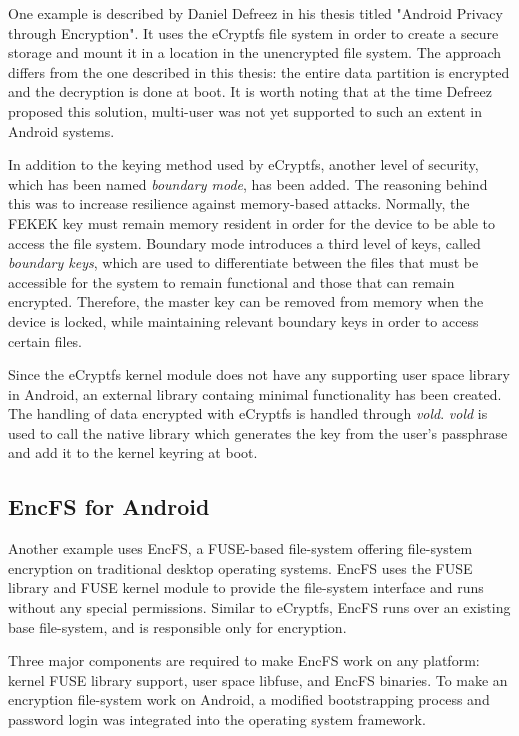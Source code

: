 One example is described by Daniel Defreez in his thesis titled "Android Privacy through Encryption"\cite{defreez}.
It uses the eCryptfs file system in order to create a secure storage and mount it in a location in the unencrypted file system. The approach differs from the one described in this thesis: the entire data partition is encrypted and the decryption is done at boot. It is worth noting that at the time Defreez proposed this solution, multi-user was not yet supported to such an extent in Android systems.

In addition to the keying method used by eCryptfs, another level of security, which has been named \textit{boundary mode}, has been added. The reasoning behind this was to increase resilience against memory-based attacks. Normally, the FEKEK key must remain memory resident in order for the device to be able to access the file system. Boundary mode introduces a third level of keys, called \textit{boundary keys}, which are used to differentiate between the files that must be accessible for the system to remain functional and those that can remain encrypted. Therefore, the master key can be removed from memory when the device is locked, while maintaining relevant boundary keys in order to access certain files.

Since the eCryptfs kernel module does not have any supporting user space library in Android, an external library containg minimal functionality has been created. The handling of data encrypted with eCryptfs is handled through \textit{vold}. \textit{vold} is used to call the native library which generates the key from the user's passphrase and add it to the kernel keyring at boot.

\subsection{EncFS for Android}
\label{sub-sec:encfs-and}

Another example\cite{encfs} uses EncFS, a FUSE-based file-system offering file-system encryption on traditional desktop operating systems. EncFS uses the FUSE library and FUSE kernel module to provide the file-system interface and runs without any special permissions. Similar to eCryptfs, EncFS runs over an existing base file-system, and is responsible only for encryption.

Three major components are required to make EncFS work on any platform: kernel FUSE library support, user space libfuse, and EncFS binaries. To make an encryption file-system work on Android, a modified bootstrapping process and password login was integrated into the operating system framework.

